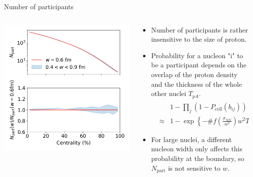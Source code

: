 \documentclass[11pt, aspectratio=169]{beamer}
\begin{document}
\begin{frame}{Number of participants}
\begin{columns}
\begin{column}{.4\textwidth}
\includegraphics[width=\textwidth]{npart.png}
\end{column}
\begin{column}{.6\textwidth}
\begin{itemize}
\item Number of participants is rather insensitive to the size of proton.
\item Probability for a nucleon "i" to be a participant depends on the overlap of the proton density and the thickness of the whole other nuclei $T_{pA}$.
\begin{eqnarray}
\nonumber
&&1 -\prod_j (1-P_{\textrm{coll}}(b_{ij}))=1-e^{-\sigma_{gg}\sum_j T_{pp}(b_{ij})}\\\nonumber
&\approx & 1-\exp\left\{- \# f(\frac{\sigma_{NN}}{w^2}) w^2 T_{pA}\right\}
\end{eqnarray}
\item For large nuclei, a different nucleon width only affects this probability at the boundary, so $N_{\textrm{part}}$ is not sensitive to $w$.
\end{itemize}
\end{column}
\end{columns}
\end{frame}
\end{document}

